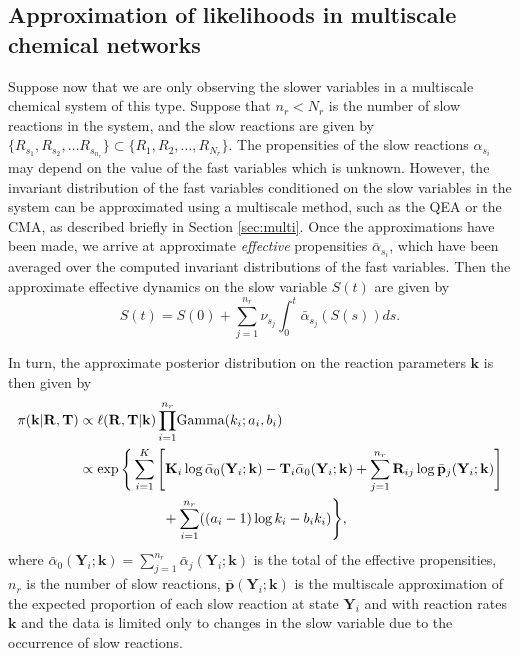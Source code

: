 \documentclass[final]{siamltex}
\begin{document}
\subsection{Approximation of likelihoods in multiscale chemical
  networks}
Suppose now that we are only observing the slower variables in a
multiscale chemical system of this type. Suppose that $n_r < N_r$ is the number of slow
reactions in the system, and the slow reactions are given by $\{R_{s_1},
R_{s_2}, \ldots R_{s_{n_r}} \} \subset \{R_1, R_2, \ldots , R_{N_r}
\}$. The propensities of the slow
reactions $\alpha_{s_i}$ may depend on the value of the fast variables which is
unknown. However, the invariant distribution of the fast variables
conditioned on the slow variables in the system can be approximated
using a multiscale method, such as the QEA or the CMA, as described
briefly in Section \ref{sec:multi}. Once the approximations have been
made, we arrive at approximate \emph{effective} propensities $\bar{\alpha}_{s_i}$, which
have been averaged over the computed invariant distributions of the
fast variables. Then the approximate effective dynamics on the slow variable $S(t)$ are given by 
\begin{equation}\label{eq:RTCS}
S(t) = S(0) + \sum_{j=1}^{n_r} \nu_{s_j} \int_0^t \bar{\alpha}_{s_j}(S(s)) ds.
\end{equation}

In turn, the approximate posterior distribution on the reaction
parameters $\mathbf{k}$ is then given by
\begin{align}
	\pi(\mathbf{k}|\mathbf{R}, \mathbf{T}) &\propto \ell(\mathbf{R}, \mathbf{T}|\mathbf{k})
	\prod_{i=1}^{n_r} \! \text{Gamma}(k_i; a_i, b_i) \notag \\
		&\propto \exp\Bigg\{\sum\limits_{i=1}^K \Bigg[
				\mathbf{K}_i\log
                  \bar{\alpha}_0(\mathbf{Y}_i; \mathbf{k}) -
                  \mathbf{T}_i \bar{\alpha}_0(\mathbf{Y}_i; \mathbf{k}) %
				+\sum_{j=1}^{n_r} \mathbf{R}_{ij}\log \bar{\mathbf{p}}_j(\mathbf{Y}_i; \mathbf{k})
			\Bigg]  \notag\\
		&	\qquad\qquad\qquad{} + \sum_{i=1}^{n_r} ((a_i-1)\log k_i - b_ik_i)\Bigg\}, \label{eq:Apos}
\end{align}
where $\bar{\alpha}_0(\mathbf{Y}_i; \mathbf{k}) = \sum_{j=1}^{n_r}
\bar{\alpha}_j(\mathbf{Y}_i; \mathbf{k})$ is the total of the
effective propensities, $n_r$ is the number of slow reactions,
$\bar{\mathbf{p}}(\mathbf{Y}_i; \mathbf{k})$ is the multiscale
approximation of the expected proportion of each slow reaction at
state $\mathbf{Y}_i$ and with reaction rates $\mathbf{k}$ and the
data is limited only to changes in the slow variable due to the
occurrence of slow reactions.
\end{document}
